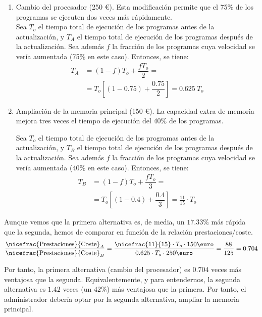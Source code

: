 \begin{enumerate}
    \item Cambio del procesador (250 \euro). Esta modificación permite que el 75\% de los programas se ejecuten dos veces más rápidamente.\\
    
    Sea $T_o$ el tiempo total de ejecución de los programas antes de la actualización, y $T_A$ el tiempo total de ejecución de los programas después de la actualización. Sea además $f$ la fracción de los programas cuya velocidad se vería aumentada (75\% en este caso). Entonces, se tiene:
    \begin{align*}
        T_A &= (1-f)T_o + \dfrac{fT_o}{2}
        =\\&= T_o\left[(1-0.75) + \dfrac{0.75}{2}\right]
        = 0.625\ T_o
    \end{align*}
    \item Ampliación de la memoria principal (150 \euro). La capacidad extra de memoria mejora tres veces el tiempo de ejecución del 40\% de los programas.
    
    Sea $T_o$ el tiempo total de ejecución de los programas antes de la actualización, y $T_B$ el tiempo total de ejecución de los programas después de la actualización. Sea además $f$ la fracción de los programas cuya velocidad se vería aumentada (40\% en este caso). Entonces, se tiene:
    \begin{align*}
        T_B &= (1-f)T_o + \dfrac{fT_o}{3}
        =\\&= T_o\left[(1-0.4) + \dfrac{0.4}{3}\right]
        = \frac{11}{15}\cdot T_o
    \end{align*}
\end{enumerate}

Aunque vemos que la primera alternativa es, de media, un $17.33\%$ más rápida que la segunda, hemos de comparar en función de la relación prestaciones/coste.
\begin{equation*}
    \frac{\nicefrac{\text{Prestaciones}}{\text{Coste}}_A}{\nicefrac{\text{Prestaciones}}{\text{Coste}}_B} = \dfrac{\nicefrac{11}{15}\cdot T_o\cdot 150\text{\euro}}{0.625\cdot T_o\cdot 250\text{\euro}} = \dfrac{88}{125}=0.704
\end{equation*}

Por tanto, la primera alternativa (cambio del procesador) es $0.704$ veces más ventajosa que la segunda. Equivalentemente, y para entendernos, la segunda alternativa es $1.42$ veces (un $42\%$) más ventajosa que la primera. Por tanto, el administrador debería optar por la segunda alternativa, ampliar la memoria principal.

